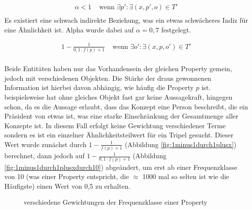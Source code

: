 \begin{align*}
\alpha<1		&\text{  wenn } \exists p': 	\exists (x,p',o) \in T'\\
\end{align*}
Es existiert eine schwach indirekte Beziehung, was ein etwas schwächeres Indiz für eine Ähnlichkeit ist. Alpha wurde dabei auf $\alpha = 0,7$ festgelegt.

\begin{align*}
1-\frac{1}{0,1 \cdot f(p)+1}	&\text{  wenn } \exists o':	\exists (x,p,o') \in T'\\
\end{align*}

Beide Entitäten haben nur das Vorhandensein der gleichen Property gemein, jedoch mit verschiedenen Objekten. Die Stärke der draus gewonnenen Information ist hierbei davon abhängig, wie häufig die Property $p$ ist.
 beispielsweise hat ohne gleiches Objekt fast gar keine Aussagekraft,  hingegen schon, da es die Aussage erlaubt, dass das Konzept eine Person beschreibt, 
die ein Präsident von etwas ist, was eine starke Einschränkung der Gesamtmenge aller Konzepte ist.
In diesem Fall erfolgt keine Gewichtung verschiedener Terme sondern es ist ein einzelner Ähnlichkeitsteilwert für ein Tripel gesucht. Dieser Wert wurde zunächst durch $1-\frac{1}{f(p)+1}$ (Abbildung \ref{fig:1minus1durch1plusx}) berechnet,
dann jedoch auf $1-\frac{1}{0,1 \cdot f(p)+1}$ (Abbildung \ref{fig:1minus1durch1plusxdurch10}) abgeändert,
um erst ab einer Frequenzklasse von 10 (was einer Property entspricht, die $\approx$ 1000 mal so selten ist wie die Häufigste) einen Wert von 0,5 zu erhalten.

\begin{figure}[H]
\caption{verschiedene Gewichtungen der Frequenzklasse einer Property}
\end{figure}


